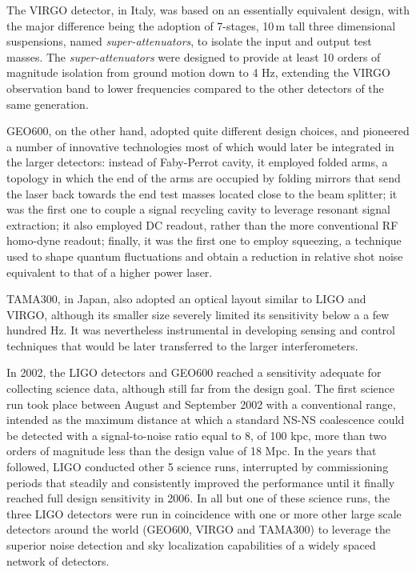 The VIRGO detector\cite{Accadia_2012}, in Italy, was based on an essentially equivalent design, with the major difference being the adoption of 7-stages, 10\,m tall three dimensional suspensions, named \textit{super-attenuators}, to isolate the input and output test masses.
The \textit{super-attenuators} were designed to provide at least 10 orders of magnitude isolation from ground motion down to 4 Hz, extending the VIRGO observation band to lower frequencies compared to the other detectors of the same generation.

GEO600\cite{L_ck_2006}, on the other hand, adopted quite different design choices, and pioneered a number of innovative technologies most of which would later be integrated in the larger detectors:
instead of Faby-Perrot cavity, it employed folded arms, a topology in which the end of the arms are occupied by folding mirrors that send the laser back towards the end test masses located close to the beam splitter;
it was the first one to couple a signal recycling cavity to leverage resonant signal extraction;
it also employed DC readout, rather than the more conventional RF homo-dyne readout;
finally, it was the first one to employ squeezing, a technique used to shape quantum fluctuations and obtain a reduction in relative shot noise equivalent to that of a higher power laser.


TAMA300\cite{Ando_2002}, in Japan, also adopted an optical layout similar to LIGO and VIRGO, although its smaller size severely limited its sensitivity below a a few hundred Hz.
It was nevertheless instrumental in developing sensing and control techniques that would be later transferred to the larger interferometers.

In 2002, the LIGO detectors and GEO600 reached a sensitivity adequate for collecting science data, although still far from the design goal.
The first science run took place between August and September 2002 with a conventional range, intended as the maximum distance at which a standard NS-NS coalescence could be detected with a signal-to-noise ratio equal to 8, of 100 kpc, more than two orders of magnitude less than the design value of 18 Mpc.
In the years that followed, LIGO conducted other 5 science runs, interrupted by commissioning periods that steadily and consistently improved the performance until it finally reached full design sensitivity in 2006. In all but one of these science runs, the three LIGO detectors were run in coincidence with one or more other large scale detectors around the world (GEO600, VIRGO and TAMA300) to leverage the superior noise detection and sky localization capabilities of a widely spaced network of detectors\cite{Abbott_2004,Abbott_2005,Abbott_2006,Abbott_2008,Abadie_2010}.

